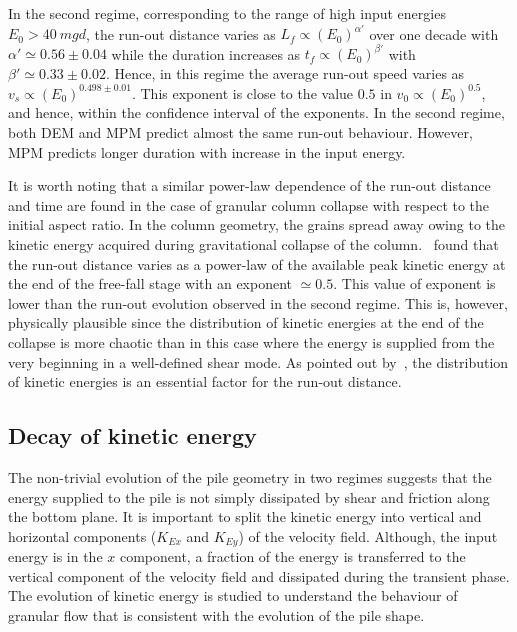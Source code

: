\documentclass[3p,times,procedia,number]{elsarticle}
\begin{document}
In the second regime, corresponding to the range of high input energies  $E_0 > 
40 \ mgd$, the run-out distance varies as $L_f \propto (E_0)^{\alpha'}$ over 
one decade with $\alpha' \simeq 0.56\pm 0.04$ while the duration increases as 
$t_f \propto (E_0)^{\beta'}$ with $\beta' \simeq 0.33 \pm 0.02$. Hence, in this 
regime the average run-out speed varies as $v_s \propto (E_0)^{0.498 \pm 
0.01}$. This exponent is close to the value $0.5$ in $v_0 \propto (E_0)^{0.5}$, 
and hence, within the confidence interval of the exponents.
In the second regime, both DEM and MPM predict almost the same run-out 
behaviour. However, MPM predicts longer duration with increase in the input 
energy.

It is worth noting that a similar power-law dependence of the run-out distance 
and time are found in the case of granular column collapse with respect to 
the initial aspect ratio. In the column geometry, the grains spread away 
owing to the kinetic energy acquired during gravitational collapse of the 
column.~\citet{Topin2012} found that the run-out distance varies as a power-law 
of the available peak kinetic energy at the end of the free-fall stage with an 
exponent $\simeq 0.5$. This value of exponent is lower than the run-out 
evolution observed in the second regime. This is, however, physically plausible 
since the distribution of kinetic energies at the end of the collapse 
is more chaotic than in this case where the energy is supplied from the very 
beginning in a well-defined shear mode. As pointed out by~\citet{Staron2005}, 
the distribution of kinetic energies is an essential factor for the run-out 
distance.

\subsection{Decay of kinetic energy}
\label{sec:decay}

The non-trivial evolution of the pile geometry in two regimes suggests that 
the energy supplied to the pile is not simply dissipated by shear and friction 
along the bottom plane. It is important to split the kinetic energy into 
vertical and horizontal components ($K_{Ex}$ and $K_{Ey}$) of the velocity 
field. Although, the input energy is in the $x$ component, a fraction of 
the energy is transferred to the vertical component of the velocity field and 
dissipated during the transient phase. The evolution of kinetic energy is 
studied to understand the behaviour of granular flow that is consistent with 
the evolution of the pile shape.
\end{document}
